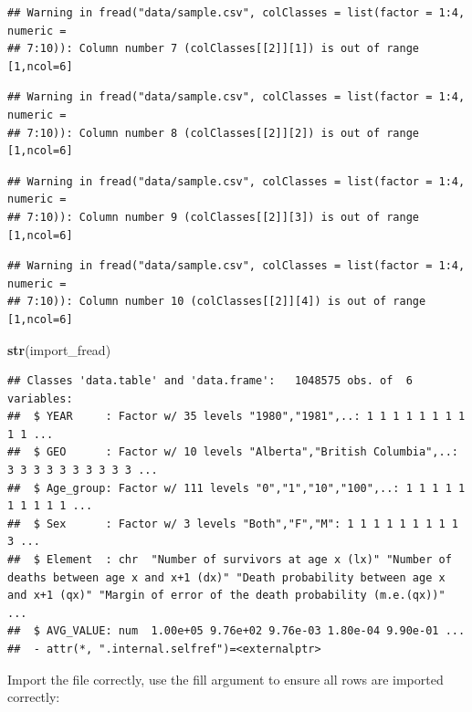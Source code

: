\documentclass[]{book}
\newenvironment{Shaded}{\begin{snugshade}}{\end{snugshade}}
\newcommand{\DataTypeTok}[1]{\textcolor[rgb]{0.13,0.29,0.53}{#1}}
\newcommand{\DecValTok}[1]{\textcolor[rgb]{0.00,0.00,0.81}{#1}}
\newcommand{\KeywordTok}[1]{\textcolor[rgb]{0.13,0.29,0.53}{\textbf{#1}}}
\newcommand{\NormalTok}[1]{#1}
\newcommand{\OperatorTok}[1]{\textcolor[rgb]{0.81,0.36,0.00}{\textbf{#1}}}
\newcommand{\OtherTok}[1]{\textcolor[rgb]{0.56,0.35,0.01}{#1}}
\newcommand{\StringTok}[1]{\textcolor[rgb]{0.31,0.60,0.02}{#1}}
\begin{document}
\begin{verbatim}
## Warning in fread("data/sample.csv", colClasses = list(factor = 1:4, numeric =
## 7:10)): Column number 7 (colClasses[[2]][1]) is out of range [1,ncol=6]
\end{verbatim}

\begin{verbatim}
## Warning in fread("data/sample.csv", colClasses = list(factor = 1:4, numeric =
## 7:10)): Column number 8 (colClasses[[2]][2]) is out of range [1,ncol=6]
\end{verbatim}

\begin{verbatim}
## Warning in fread("data/sample.csv", colClasses = list(factor = 1:4, numeric =
## 7:10)): Column number 9 (colClasses[[2]][3]) is out of range [1,ncol=6]
\end{verbatim}

\begin{verbatim}
## Warning in fread("data/sample.csv", colClasses = list(factor = 1:4, numeric =
## 7:10)): Column number 10 (colClasses[[2]][4]) is out of range [1,ncol=6]
\end{verbatim}

\begin{Shaded}
\begin{Highlighting}[]
\KeywordTok{str}\NormalTok{(import_fread)}
\end{Highlighting}
\end{Shaded}

\begin{verbatim}
## Classes 'data.table' and 'data.frame':	1048575 obs. of  6 variables:
##  $ YEAR     : Factor w/ 35 levels "1980","1981",..: 1 1 1 1 1 1 1 1 1 1 ...
##  $ GEO      : Factor w/ 10 levels "Alberta","British Columbia",..: 3 3 3 3 3 3 3 3 3 3 ...
##  $ Age_group: Factor w/ 111 levels "0","1","10","100",..: 1 1 1 1 1 1 1 1 1 1 ...
##  $ Sex      : Factor w/ 3 levels "Both","F","M": 1 1 1 1 1 1 1 1 1 3 ...
##  $ Element  : chr  "Number of survivors at age x (lx)" "Number of deaths between age x and x+1 (dx)" "Death probability between age x and x+1 (qx)" "Margin of error of the death probability (m.e.(qx))" ...
##  $ AVG_VALUE: num  1.00e+05 9.76e+02 9.76e-03 1.80e-04 9.90e-01 ...
##  - attr(*, ".internal.selfref")=<externalptr>
\end{verbatim}

Import the file correctly, use the fill argument to ensure all rows are imported correctly:

\begin{Shaded}
\end{Shaded}
\end{document}
